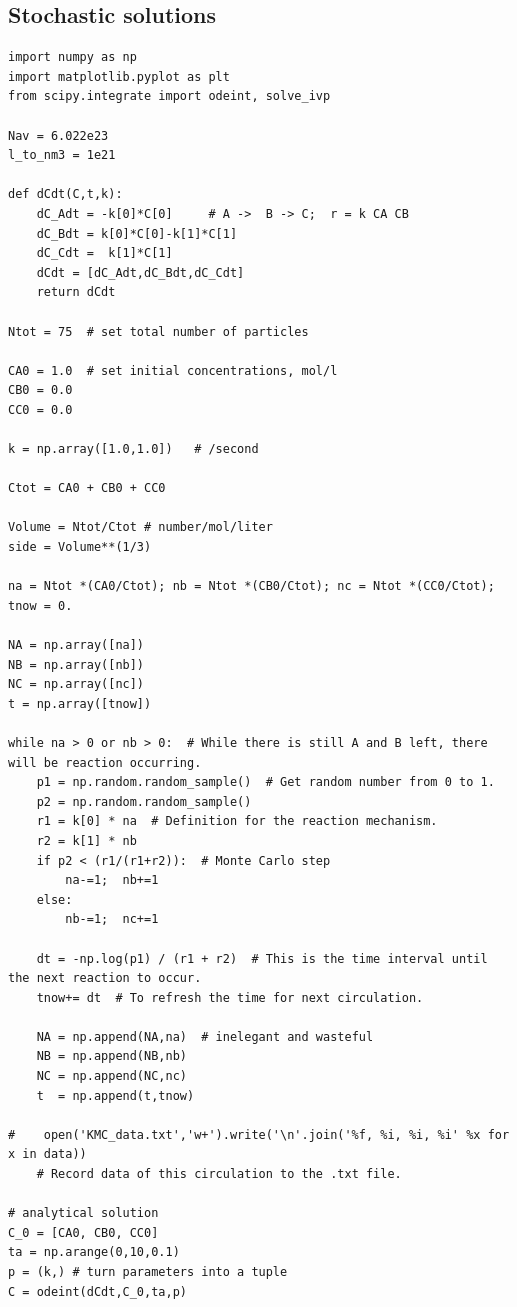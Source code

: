 \documentclass[11pt]{article}
\begin{document}
\subsection{Stochastic solutions}
\label{sec:org599013a}

\begin{verbatim}
import numpy as np
import matplotlib.pyplot as plt 
from scipy.integrate import odeint, solve_ivp

Nav = 6.022e23
l_to_nm3 = 1e21

def dCdt(C,t,k):
    dC_Adt = -k[0]*C[0]     # A ->  B -> C;  r = k CA CB
    dC_Bdt = k[0]*C[0]-k[1]*C[1]
    dC_Cdt =  k[1]*C[1]
    dCdt = [dC_Adt,dC_Bdt,dC_Cdt] 
    return dCdt

Ntot = 75  # set total number of particles

CA0 = 1.0  # set initial concentrations, mol/l
CB0 = 0.0
CC0 = 0.0

k = np.array([1.0,1.0])   # /second

Ctot = CA0 + CB0 + CC0

Volume = Ntot/Ctot # number/mol/liter
side = Volume**(1/3)

na = Ntot *(CA0/Ctot); nb = Ntot *(CB0/Ctot); nc = Ntot *(CC0/Ctot); tnow = 0.

NA = np.array([na])
NB = np.array([nb])
NC = np.array([nc])
t = np.array([tnow])

while na > 0 or nb > 0:  # While there is still A and B left, there will be reaction occurring.
    p1 = np.random.random_sample()  # Get random number from 0 to 1.
    p2 = np.random.random_sample()
    r1 = k[0] * na  # Definition for the reaction mechanism.
    r2 = k[1] * nb
    if p2 < (r1/(r1+r2)):  # Monte Carlo step
        na-=1;  nb+=1
    else:
        nb-=1;  nc+=1

    dt = -np.log(p1) / (r1 + r2)  # This is the time interval until the next reaction to occur.
    tnow+= dt  # To refresh the time for next circulation.
    
    NA = np.append(NA,na)  # inelegant and wasteful
    NB = np.append(NB,nb)
    NC = np.append(NC,nc)
    t  = np.append(t,tnow)

#    open('KMC_data.txt','w+').write('\n'.join('%f, %i, %i, %i' %x for x in data))
    # Record data of this circulation to the .txt file.

# analytical solution
C_0 = [CA0, CB0, CC0]
ta = np.arange(0,10,0.1) 
p = (k,) # turn parameters into a tuple
C = odeint(dCdt,C_0,ta,p)


\end{verbatim}
\end{document}
